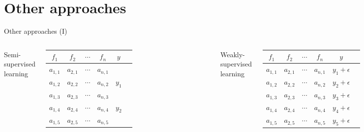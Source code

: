 \documentclass[10pt,compress]{beamer} %
\begin{document}
\section{Other approaches}
\begin{frame}[fragile]{Other approaches (I)}
    \begin{center}
         \begin{columns}
        \centering Semi-supervised learning\\
    	\begin{tabular}{cccccc}\hline
    	 	$f_1$     & $f_2$     & $\cdots$ & $f_n$     & $y$\\\hline
    	 	$a_{1,1}$ & $a_{2,1}$ & $\cdots$ & $a_{n,1}$ &  \\
    	 	$a_{1,2}$ & $a_{2,2}$ & $\cdots$ & $a_{n,2}$ & $y_1$ \\
    	 	$a_{1,3}$ & $a_{2,3}$ & $\cdots$ & $a_{n,3}$ &  \\
    	 	$a_{1,4}$ & $a_{2,4}$ & $\cdots$ & $a_{n,4}$ & $y_2$ \\
    	 	$a_{1,5}$ & $a_{2,5}$ & $\cdots$ & $a_{n,5}$ &  \\
    	 	\hline
    	\end{tabular}

        \centering Weakly-supervised learning\\
    	\begin{tabular}{cccccc}\hline
    	 	$f_1$     & $f_2$     & $\cdots$ & $f_n$     & $y$\\\hline
    	 	$a_{1,1}$ & $a_{2,1}$ & $\cdots$ & $a_{n,1}$ & $y_1 + \epsilon$ \\
    	 	$a_{1,2}$ & $a_{2,2}$ & $\cdots$ & $a_{n,2}$ & $y_2 + \epsilon$ \\
    	 	$a_{1,3}$ & $a_{2,3}$ & $\cdots$ & $a_{n,3}$ & $y_3 + \epsilon$ \\
    	 	$a_{1,4}$ & $a_{2,4}$ & $\cdots$ & $a_{n,4}$ & $y_4 + \epsilon$ \\
    	 	$a_{1,5}$ & $a_{2,5}$ & $\cdots$ & $a_{n,5}$ & $y_5 + \epsilon$ \\
    	 	\hline
    	\end{tabular}
        \end{columns}

        \bigskip


\end{center}
\end{frame}
\end{document}
